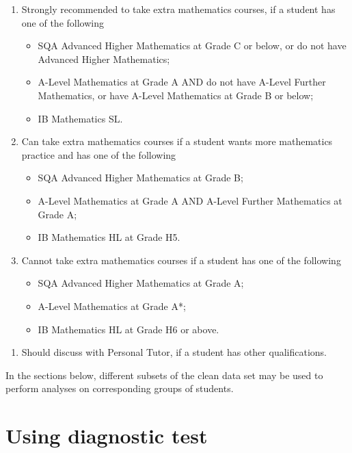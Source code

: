 \documentclass[a4paper]{report}
\begin{document}
\begin{enumerate}[{Category} 1]
\item Strongly recommended to take extra mathematics courses, if a student has one of the following
  \begin{itemize}
  \item SQA Advanced Higher Mathematics at Grade C or below, or do not have Advanced Higher Mathematics; 
  \item A-Level Mathematics at Grade A AND do not have A-Level Further Mathematics, or have A-Level Mathematics at Grade B or below; 
  \item IB Mathematics SL. 
  \end{itemize}

\item Can take extra mathematics courses if a student wants more mathematics practice and has one of the following
  \begin{itemize}
  \item SQA Advanced Higher Mathematics at Grade B; 
  \item A-Level Mathematics at Grade A AND A-Level Further Mathematics at Grade A; 
  \item IB Mathematics HL at Grade H5. 
  \end{itemize}

\item Cannot take extra mathematics courses if a student has one of the following
  \begin{itemize}
  \item SQA Advanced Higher Mathematics at Grade A; 
  \item A-Level Mathematics at Grade A*; 
  \item IB Mathematics HL at Grade H6 or above. 
  \end{itemize}
\end{enumerate}

\begin{enumerate}[Unknown]
\item Should discuss with Personal Tutor, if a student has other qualifications. 
\end{enumerate}

In the sections below, different subsets of the clean data set may be used to perform analyses on corresponding groups of students.  

\section{Using diagnostic test}
\end{document}
